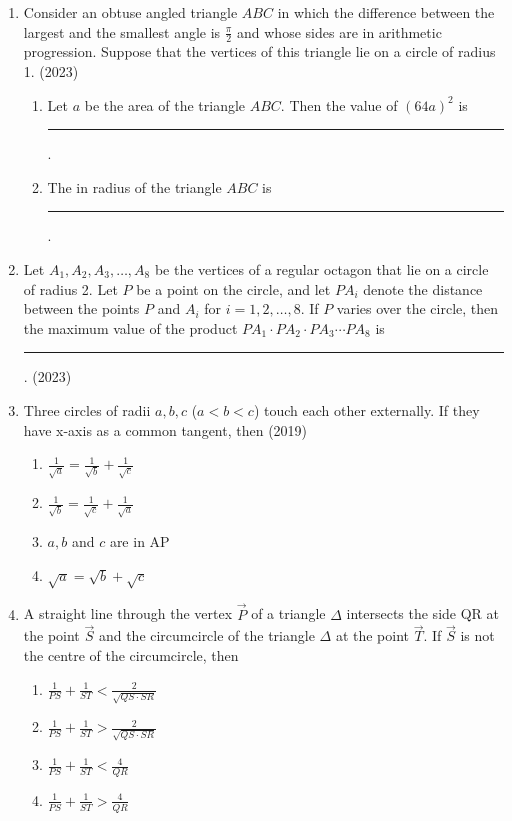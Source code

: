 \begin{enumerate}[label=\thesubsection.\arabic*,ref=\thesubsection.\theenumi]
\item Consider an obtuse angled triangle $ABC$ in which the difference between the largest and the smallest angle is $\frac{\pi}{2}$ and whose sides are in arithmetic progression. Suppose that the vertices of this triangle lie on a circle of radius 1.
\hfill (2023)
\begin{enumerate}
\item Let $a$ be the area of the triangle $ABC$. Then the value of $(64a)^2$ is
\rule{1cm}{0.1pt}.
\item The in radius of the triangle $ABC$ is
\rule{1cm}{0.1pt}.
\end{enumerate}
%
\item Let $A_1, A_2, A_3, \dots, A_8$ be the vertices of a regular octagon that lie on a circle of radius 2. Let $P$ be a point on the circle, and let $PA_i$ denote the distance between the points $P$ and $A_i$ for $i = 1,2, \dots, 8$. If $P$ varies over the circle, then the maximum value of the product $PA_1 \cdot PA_2 \cdot PA_3 \cdots PA_8$ is
\rule{1cm}{0.1pt}.
\hfill (2023)
\item Three circles of radii $a,  b,  c$ ($a<b<c$) touch each other externally. If they have x-axis as a common tangent,  then \hfill{(2019)}
	\begin{multicols}{2}
		\begin{enumerate}[itemsep=1ex]
%  
  \item {$\frac{1}{\sqrt{a}}=\frac{1}{\sqrt{b}}+\frac{1}{\sqrt{c}}$} 
  \item {$\frac{1}{\sqrt{b}}=\frac{1}{\sqrt{c}}+\frac{1}{\sqrt{a}}$} 
  \item$a, b$ and $c$ are in AP
  \item{${\sqrt{a}}={\sqrt{b}}+{\sqrt{c}}$}
  \end{enumerate}
\end{multicols} 
\item A straight line through the vertex $\vec{P}$ of a triangle $\Delta$ intersects the side QR at the point $\vec{S}$ and the circumcircle of the triangle $\Delta$ at the point $\vec{T}$. If $\vec{S}$ is not the centre of the circumcircle, then  \hfill{}
\begin{multicols}{2}
\begin{enumerate}    
\item $\frac{1}{PS}+\frac{1}{ST}<\frac{2}{\sqrt{QS \cdot SR}}$
\item $\frac{1}{PS}+\frac{1}{ST}>\frac{2}{\sqrt{QS \cdot SR}}$
\item $\frac{1}{PS}+\frac{1}{ST}<\frac{4}{QR}$
\item $\frac{1}{PS}+\frac{1}{ST}>\frac{4}{QR}$
\end{enumerate}
\end{multicols}
\end{enumerate}
